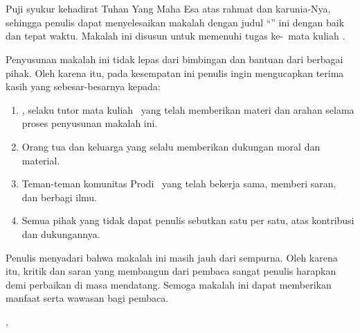 %
%
%
\chapter*{\KataPengantar}


Puji syukur kehadirat Tuhan Yang Maha Esa atas rahmat dan karunia-Nya, sehingga penulis dapat menyelesaikan makalah dengan judul ``\judul'' ini dengan baik dan tepat waktu. Makalah ini disusun untuk memenuhi tugas ke-\tugasKe\ mata kuliah \namaMataKuliah.

Penyusunan makalah ini tidak lepas dari bimbingan dan bantuan dari berbagai pihak. Oleh karena itu, pada kesempatan ini penulis ingin mengucapkan terima kasih yang sebesar-besarnya kepada:

\begin{enumerate}[]
    \item \namaTutorPengampuTanpaGelar, selaku tutor mata kuliah \namaMataKuliah\ yang telah memberikan materi dan arahan selama proses penyusunan makalah ini.
    \item Orang tua dan keluarga yang selalu memberikan dukungan moral dan material.
    \item Teman-teman komunitas Prodi \programStudi\  yang telah bekerja sama,  memberi saran, dan berbagi ilmu.
    \item Semua pihak yang tidak dapat penulis sebutkan satu per satu, atas kontribusi dan dukungannya.
\end{enumerate}

Penulis menyadari bahwa makalah ini masih jauh dari sempurna. Oleh karena itu, kritik dan saran yang membangun dari pembaca sangat penulis harapkan demi perbaikan di masa mendatang. Semoga makalah ini dapat memberikan manfaat serta wawasan bagi pembaca.

\vfill
\hfill \daerahMahasiswa, \tanggalLengkap


\hfill \namaMahasiswa
\vfill